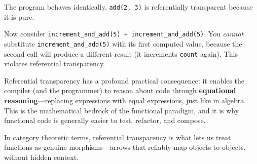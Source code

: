 The program behaves identically. \texttt{add(2, 3)} is referentially transparent because it is pure.

Now consider \texttt{increment\_and\_add(5) + increment\_and\_add(5)}. You \textit{cannot} substitute \texttt{increment\_and\_add(5)} with its first computed value, because the second call will produce a different result (it increments \texttt{count} again). This violates referential transparency.

Referential transparency has a profound practical consequence: it enables the compiler (and the programmer) to reason about code through \textbf{equational reasoning}---replacing expressions with equal expressions, just like in algebra. This is the mathematical bedrock of the functional paradigm, and it is why functional code is generally easier to test, refactor, and compose.

In category theoretic terms, referential transparency is what lets us treat functions as genuine morphisms---arrows that reliably map objects to objects, without hidden context.
